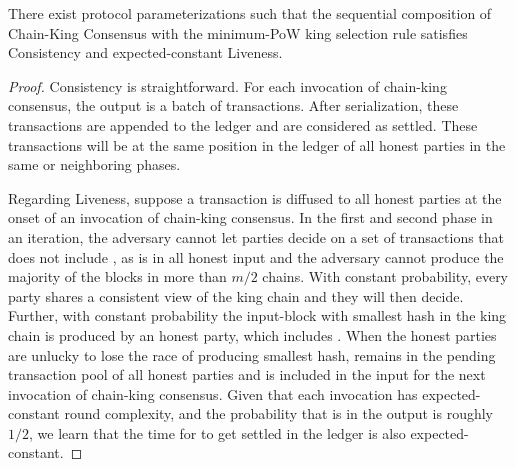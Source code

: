 \begin{theorem} \label{thm:state-machine-replication}
    There exist protocol parameterizations such that the sequential composition of Chain-King Consensus with the minimum-PoW king selection rule satisfies Consistency and expected-constant Liveness.
\end{theorem}

\begin{proof}
    Consistency is straightforward.
    For each invocation of chain-king consensus, the output is a batch of transactions.
    After serialization, these transactions are appended to the ledger and are considered as settled.
    These transactions will be at the same position in the ledger of all honest parties in the same or neighboring phases.

    Regarding Liveness, suppose a transaction \tx is diffused to all honest parties at the onset of an invocation of chain-king consensus.
    In the first and second phase in an iteration, the adversary cannot let parties decide on a set of transactions that does not include \tx, as \tx is in all honest input and the adversary cannot produce the majority of the blocks in more than $m/2$ chains.
    With constant probability, every party shares a consistent view of the king chain and they will then decide.
    Further, with constant probability the input-block with smallest hash in the king chain is produced by an honest party, which includes \tx.
    When the honest parties are unlucky to lose the race of producing smallest hash, \tx remains in the pending transaction pool of all honest parties and is included in the input for the next invocation of chain-king consensus.
    Given that each invocation has expected-constant round complexity, and the probability that \tx is in the output is roughly $1 / 2$, we learn that the time for \tx to get settled in the ledger is also expected-constant.
\end{proof}
